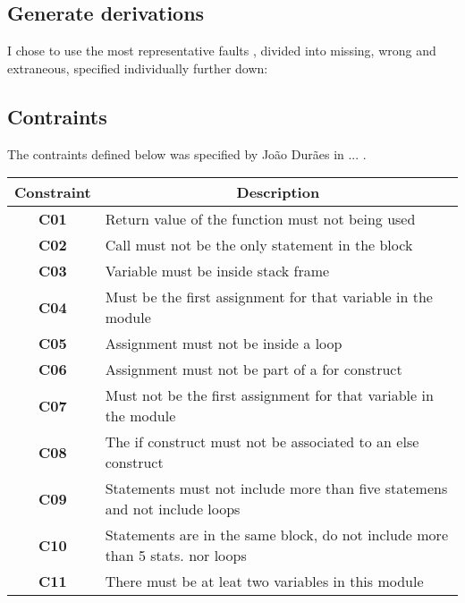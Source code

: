\subsection{Generate derivations}

I chose to use the most representative faults \cite{duraes2006emulation}, divided into missing, wrong and extraneous, specified individually further down:

\subsection{Contraints}

The contraints defined below was specified by João Durães in ... .

\begin{table}[h]
\begin{tabular}{|c|l|}
\hline
\textbf{Constraint}             & \multicolumn{1}{c|}{\textbf{Description}}                                     \\ \hline
\textbf{C01}       \label{C01}  & Return value of the function must not being used                              \\ \hline
\textbf{C02}       \label{C02}  & Call must not be the only statement in the block                              \\ \hline
\textbf{C03}       \label{C03}  & Variable must be inside stack frame                                           \\ \hline
\textbf{C04}       \label{C04}  & Must be the first assignment for that variable in the module                  \\ \hline
\textbf{C05}       \label{C05}  & Assignment must not be inside a loop                                          \\ \hline
\textbf{C06}       \label{C06}  & Assignment must not be part of a for construct                                \\ \hline
\textbf{C07}       \label{C07}  & Must not be the first assignment for that variable in the module              \\ \hline
\textbf{C08}       \label{C08}  & The if construct must not be associated to an else construct                  \\ \hline
\textbf{C09}       \label{C09}  & Statements must not include more than five statemens and not include loops    \\ \hline
\textbf{C10}       \label{C010} & Statements are in the same block, do not include more than 5 stats. nor loops \\ \hline
\textbf{C11}       \label{C011} & There must be at leat two variables in this module                            \\ \hline
\end{tabular}
\end{table}

